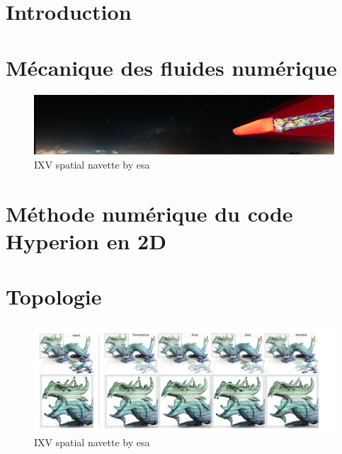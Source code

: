 \documentclass{report}
\begin{document}
\dominitoc
\setcounter{minitocdepth}{3}
\tableofcontents


\large{

\chapter{Introduction}



\chapter{Mécanique des fluides numérique}

\begin{figure}[!ht]
 \centering
 \includegraphics[width=1\linewidth]{chapter1_introduction/pictures/picture_chapter.png}
 \vspace{-2ex}
 \caption{IXV spatial navette by esa}
  \vspace{2ex}
 \label{chap1}
\end{figure}
\minitoc
\thispagestyle{empty}
\newpage







\chapter{Méthode numérique du code Hyperion en 2D}

\minitoc
\thispagestyle{empty}
\newpage



\chapter{Topologie}
\begin{figure}[!ht]
 \centering
 \includegraphics[width=1\linewidth]{chapter4_topology_data_analysis/pictures/picture_chapter.png}
 \vspace{-2ex}
 \caption{IXV spatial navette by esa}
  \vspace{2ex}
 \label{11}
\end{figure}
\minitoc
\thispagestyle{empty}
\newpage

}
\end{document}
